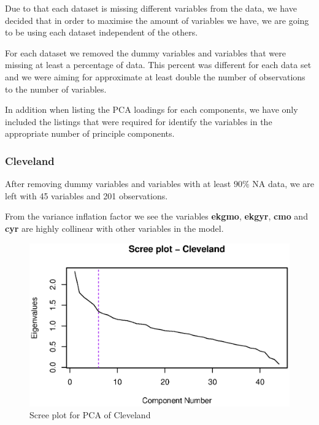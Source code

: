 \documentclass[a4paper]{article}
\begin{document}
Due to that each dataset is missing different variables from the data, we have decided that in order to maximise the amount of variables we have, we are going to be using each dataset independent of the others. 

For each dataset we removed the dummy variables and variables that were missing at least a percentage of data. This percent was different for each data set and we were aiming for approximate at least double the number of observations to the number of variables. 

In addition when listing the PCA loadings for each components, we have only included the listings that were required for identify the variables in the appropriate number of principle components. 

\subsubsection{Cleveland}

After removing dummy variables and variables with at least $90\%$ NA data, we are left with 45 variables and 201 observations. 



From the variance inflation factor we see the variables \textbf{ekgmo}, \textbf{ekgyr}, \textbf{cmo} and \textbf{cyr} are highly collinear with other variables in the model.

\begin{figure}[H]
	\begin{center}
		\includegraphics[width=12cm]{question3output/clescreeplot.eps}
	\end{center}
	\caption{Scree plot for PCA of Cleveland}
	\label{q3-cle-screeplot}
\end{figure}
\end{document}
